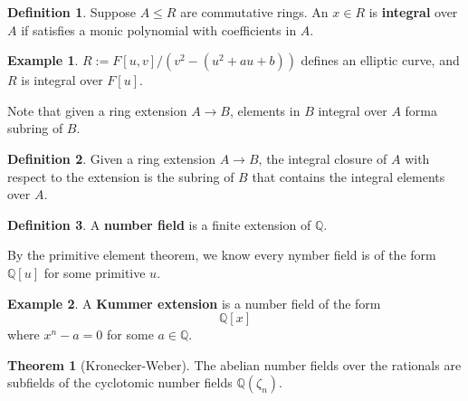 \documentclass{article}
\theoremstyle{definition}
\newtheorem{theorem}{Theorem}[section]
\theoremstyle{definition}
\newtheorem{definition}{Definition}[theorem]
\theoremstyle{definition}
\theoremstyle{definition}
\theoremstyle{definition}
\theoremstyle{definition}
\theoremstyle{definition}
\newtheorem{example}{Example}[theorem]
\begin{document}
\begin{tcolorbox}[colback=purple!5!white,colframe=purple!75!black]
\begin{definition}
Suppose $A\leq R$ are commutative rings. An $x\in R$ is \textbf{integral} over $A$ if satisfies a monic polynomial with coefficients in $A$. 
\end{definition}
\end{tcolorbox}



\begin{tcolorbox}[colback=yellow!5!white,colframe=yellow!30!white]
\begin{example}
$R:=F[u,v]/(v^2-(u^2+au+b))$ defines an elliptic curve, and $R$ is integral over $F[u]$. 
\end{example}
\end{tcolorbox}

Note that given a ring extension $A\to B$, elements in $B$ integral over $A$ forma  subring of $B$. 


\begin{tcolorbox}[colback=purple!5!white,colframe=purple!75!black]
\begin{definition}
Given a ring extension $A\to B$, the integral closure of $A$ with respect to the extension is the subring of $B$ that contains the integral elements over $A$. 
\end{definition}
\end{tcolorbox}



\begin{tcolorbox}[colback=purple!5!white,colframe=purple!75!black]
\begin{definition}
A \textbf{number field } is a finite extension of $\mathbb{Q}$. 
\end{definition}
\end{tcolorbox}
By the primitive element theorem, we know every nymber field is of the form $\mathbb{Q}[u]$ for some primitive $u$. 


\begin{tcolorbox}[colback=yellow!5!white,colframe=yellow!30!white]
\begin{example}
A \textbf{Kummer extension} is a number field of the form 
\[\mathbb{Q}[x]\]
where $x^n-a=0$ for some $a\in \mathbb{Q}$. 

\end{example}
\end{tcolorbox}


\begin{tcolorbox}[colback=red!5!white,colframe=red!30!white]
\begin{theorem}[Kronecker-Weber]
    The abelian number fields over the rationals are subfields of the cyclotomic number fields $\mathbb{Q}(\zeta_n)$. 

\end{theorem}
\end{tcolorbox}
\end{document}
